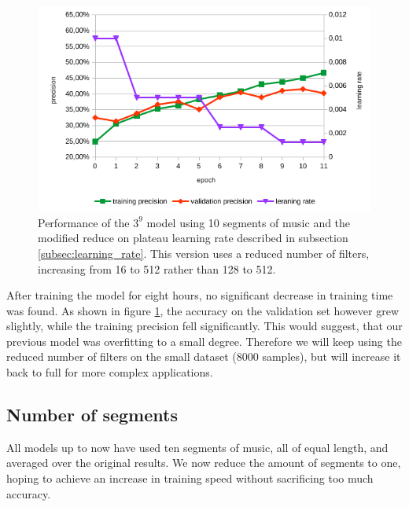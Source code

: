 \begin{figure}[!htb]
	\centering
	\includegraphics[width=.9\linewidth]{images/sample-dcnn-m3-n9-seg10-16_512-plateau_mod.png}
	\caption{Performance of the $3^9$ model using 10 segments of music and the modified reduce on plateau learning rate described in subsection \ref{subsec:learning_rate}. This version uses a reduced number of filters, increasing from 16 to 512 rather than 128 to 512.}
	\label{fig:sample-dcnn-m3-n9-seg10-16_512-plateau_mod}
\end{figure}

After training the model for eight hours, no significant decrease in training time was found. As shown in figure \ref{fig:sample-dcnn-m3-n9-seg10-16_512-plateau_mod}, the accuracy on the validation set however grew slightly, while the training precision fell significantly. This would suggest, that our previous model was overfitting to a small degree. Therefore we will keep using the reduced number of filters on the small dataset (8000 samples), but will increase it back to full for more complex applications.

\subsection{Number of segments}
\label{subsec:segments}

All models up to now have used ten segments of music, all of equal length, and averaged over the original results. We now reduce the amount of segments to one, hoping to achieve an increase in training speed without sacrificing too much accuracy.

